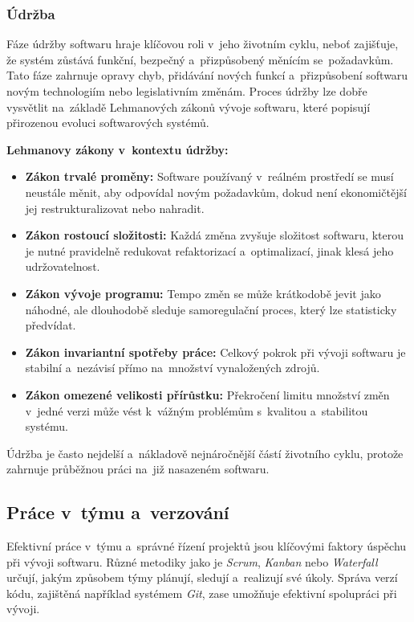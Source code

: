 \documentclass[male,czech,api_bc]{kitheses}
\begin{document}
\subsubsection{Údržba}

Fáze údržby softwaru hraje klíčovou roli v~jeho životním cyklu, neboť zajišťuje, že systém zůstává funkční, bezpečný a~přizpůsobený měnícím se~požadavkům. Tato fáze zahrnuje opravy chyb, přidávání nových funkcí a~přizpůsobení softwaru novým technologiím nebo legislativním změnám. Proces údržby lze dobře vysvětlit na~základě Lehmanových zákonů vývoje softwaru, které popisují přirozenou evoluci softwarových systémů.

\textbf{Lehmanovy zákony v~kontextu údržby:}
\begin{itemize}
	\item \textbf{Zákon trvalé proměny:} Software používaný v~reálném prostředí se musí neustále měnit, aby odpovídal novým požadavkům, dokud není ekonomičtější jej restrukturalizovat nebo nahradit.
	\item \textbf{Zákon rostoucí složitosti:} Každá změna zvyšuje složitost softwaru, kterou je nutné pravidelně redukovat refaktorizací a~optimalizací, jinak klesá jeho udržovatelnost.
	\item \textbf{Zákon vývoje programu:} Tempo změn se může krátkodobě jevit jako náhodné, ale dlouhodobě sleduje samoregulační proces, který lze statisticky předvídat.
	\item \textbf{Zákon invariantní spotřeby práce:} Celkový pokrok při vývoji softwaru je stabilní a~nezávisí přímo na~množství vynaložených zdrojů.
	\item \textbf{Zákon omezené velikosti přírůstku:} Překročení limitu množství změn v~jedné verzi může vést k~vážným problémům s~kvalitou a~stabilitou systému.
\end{itemize}

Údržba je často nejdelší a~nákladově nejnáročnější částí životního cyklu, protože zahrnuje průběžnou práci na~již nasazeném softwaru.

\subsection{Práce v~týmu a~verzování}

Efektivní práce v~týmu a~správné řízení projektů jsou klíčovými faktory úspěchu při vývoji softwaru. Různé metodiky jako je \textit{Scrum}, \textit{Kanban} nebo \textit{Waterfall} určují, jakým způsobem týmy plánují, sledují a~realizují své úkoly. Správa verzí kódu, zajištěná například systémem \textit{Git}, zase umožňuje efektivní spolupráci při vývoji.
\end{document}
